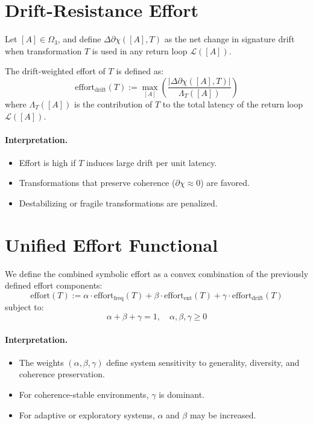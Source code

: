 \section{Drift-Resistance Effort} \label{drift-resistance-effort}

Let $[A] \in \Omega_3$, and define $\Delta\partial\chi([A], T)$ as the net change in signature drift when transformation $T$ is used in any return loop $\mathcal{L}([A])$.

\begin{definition}
The drift-weighted effort of $T$ is defined as:
\begin{equation} \label{eq:effort-drift}
\text{effort}_{\text{drift}}(T) := \max_{[A]} \left( \frac{|\Delta\partial\chi([A], T)|}{\Lambda_T([A])} \right)
\end{equation}
where $\Lambda_T([A])$ is the contribution of $T$ to the total latency of the return loop $\mathcal{L}([A])$.
\end{definition}

\paragraph{Interpretation.}
\begin{itemize}
    \item Effort is high if $T$ induces large drift per unit latency.
    \item Transformations that preserve coherence ($\partial\chi \approx 0$) are favored.
    \item Destabilizing or fragile transformations are penalized.
\end{itemize}

\section{Unified Effort Functional} \label{unified-effort-functional}

We define the combined symbolic effort as a convex combination of the previously defined effort components:
\begin{equation} \label{eq:unified-effort}
\text{effort}(T) := \alpha \cdot \text{effort}_{\text{freq}}(T)
+ \beta \cdot \text{effort}_{\text{ent}}(T)
+ \gamma \cdot \text{effort}_{\text{drift}}(T)
\end{equation}
subject to:
\[
\alpha + \beta + \gamma = 1, \quad \alpha, \beta, \gamma \geq 0
\]

\paragraph{Interpretation.}
\begin{itemize}
    \item The weights $(\alpha, \beta, \gamma)$ define system sensitivity to generality, diversity, and coherence preservation.
    \item For coherence-stable environments, $\gamma$ is dominant.
    \item For adaptive or exploratory systems, $\alpha$ and $\beta$ may be increased.
\end{itemize}

